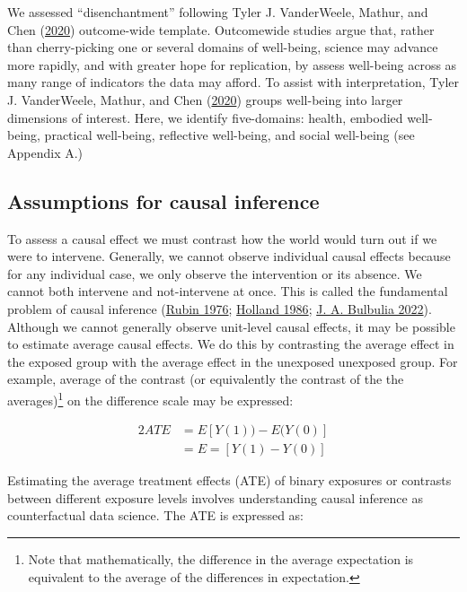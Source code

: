 \documentclass[
  singlecolumn]{report}
\begin{document}
We assessed ``disenchantment'' following Tyler J. VanderWeele, Mathur,
and Chen (\protect\hyperlink{ref-vanderweele2020}{2020}) outcome-wide
template. Outcomewide studies argue that, rather than cherry-picking one
or several domains of well-being, science may advance more rapidly, and
with greater hope for replication, by assess well-being across as many
range of indicators the data may afford. To assist with interpretation,
Tyler J. VanderWeele, Mathur, and Chen
(\protect\hyperlink{ref-vanderweele2020}{2020}) groups well-being into
larger dimensions of interest. Here, we identify five-domains: health,
embodied well-being, practical well-being, reflective well-being, and
social well-being (see Appendix A.)

\hypertarget{assumptions-for-causal-inference}{
\subsection{Assumptions for causal
inference}\label{assumptions-for-causal-inference}}

To assess a causal effect we must contrast how the world would turn out
if we were to intervene. Generally, we cannot observe individual causal
effects because for any individual case, we only observe the
intervention or its absence. We cannot both intervene and not-intervene
at once. This is called the fundamental problem of causal inference
(\protect\hyperlink{ref-rubin1976}{Rubin 1976};
\protect\hyperlink{ref-holland1986}{Holland 1986};
\protect\hyperlink{ref-bulbulia2022}{J. A. Bulbulia 2022}). Although we
cannot generally observe unit-level causal effects, it may be possible
to estimate average causal effects. We do this by contrasting the
average effect in the exposed group with the average effect in the
unexposed unexposed group. For example, average of the contrast (or
equivalently the contrast of the the averages)\footnote{Note that
  mathematically, the difference in the average expectation is
  equivalent to the average of the differences in expectation.} on the
difference scale may be expressed:

\begin{alignat*}{2}
ATE & = E[Y(1)) - E(Y(0)]\\
& = E=[Y(1) - Y(0)]
\end{alignat*}

Estimating the average treatment effects (ATE) of binary exposures or
contrasts between different exposure levels involves understanding
causal inference as counterfactual data science. The ATE is expressed
as:
\end{document}
